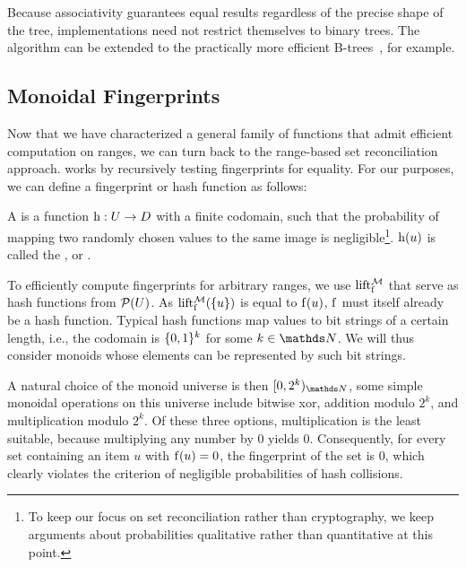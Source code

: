 \documentclass[conference]{IEEEtran}
\begin{document}
Because associativity guarantees equal results regardless of the precise shape of the tree, implementations need not restrict themselves to binary trees. The algorithm can be extended to the practically more efficient B-trees~\cite{bayer2002organization}, for example.

\subsection{Monoidal Fingerprints}

Now that we have characterized a general family of functions that admit efficient computation on ranges, we can turn back to the range-based set reconciliation approach.  works by recursively testing fingerprints for equality. For our purposes,
we can define a fingerprint or hash function as follows:

\begin{definition}
A  is a function ${\operatorname{h}}: {U} \rightarrow {D}$ with a finite codomain, such that the probability of mapping two randomly chosen values to the same image is negligible\footnote{To keep our focus on set reconciliation rather than cryptography, we keep arguments about probabilities qualitative rather than quantitative at this point.}. $\operatorname{h}(u)$ is called the ,  or .
\end{definition}

To efficiently compute fingerprints for arbitrary ranges, we use \somewhatmorphisms{} $\operatorname{lift_{\operatorname{f}}^{\mathcal{M}}}$ that serve as hash functions from $\mathcal{P}({U})$. As $\operatorname{lift_{\operatorname{f}}^{\mathcal{M}}}(\{u\})$ is equal to $\operatorname{f}(u)$, $\operatorname{f}$ must itself already be a hash function. Typical hash functions map values to bit strings of a certain length, i.e., the codomain is $\{0, 1\}^k$ for some $k \in \N$. We will thus consider monoids whose elements can be represented by such bit strings.

A natural choice of the monoid universe is then $\range{0}{2^k}{\N}$, some simple monoidal operations on this universe include bitwise xor, addition modulo $2^k$, and multiplication modulo $2^k$. Of these three options, multiplication is the least suitable, because multiplying any number by $0$ yields $0$. Consequently, for every set containing an item $u$ with $\operatorname{f}(u) = 0$, the fingerprint of the set is $0$, which clearly violates the criterion of negligible probabilities of hash collisions.
\end{document}
